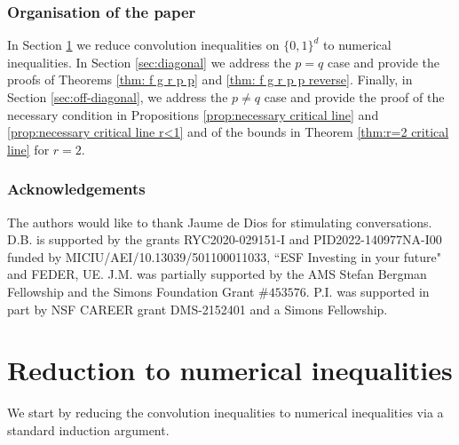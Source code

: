 \documentclass[reqno, 10pt]{amsart}
\theoremstyle{plain}
\numberwithin{equation}{section}
\theoremstyle{definition}
\newtheorem*{induction hypothesis}{Induction hypothesis}
\theoremstyle{remark}
\begin{document}
\subsubsection*{Organisation of the paper} In Section \ref{sec:induction} we reduce convolution inequalities on $\{0,1\}^d$ to numerical inequalities. In Section \ref{sec:diagonal} we address the $p=q$ case and provide the proofs of Theorems \ref{thm: f g r p p} and \ref{thm: f g r p p reverse}. Finally, in Section \ref{sec:off-diagonal}, we address the $p \neq q$ case and provide the proof of the necessary condition in Propositions \ref{prop:necessary critical line} and \ref{prop:necessary critical line r<1} and of the bounds in Theorem \ref{thm:r=2 critical line} for $r=2$.

\subsubsection*{Acknowledgements}
The authors would like to thank Jaume de Dios for stimulating conversations. D.B. is supported by the grants RYC2020-029151-I and PID2022-140977NA-I00 funded by MICIU/AEI/10.13039/501100011033, ``ESF Investing in your future" and FEDER, UE. J.M. was partially supported by the AMS Stefan Bergman Fellowship and the Simons Foundation Grant $\# 453576$.  P.I. was supported in part by NSF CAREER grant DMS-2152401 and a Simons Fellowship.


\section{Reduction to numerical inequalities}\label{sec:induction}


We start by reducing the convolution inequalities to numerical inequalities via a standard induction argument. 
\end{document}
